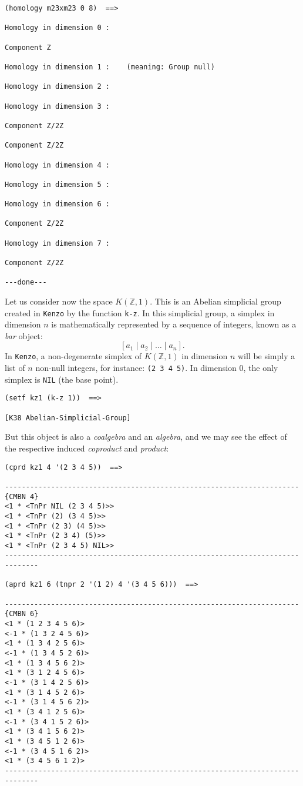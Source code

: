 {\footnotesize\begin{verbatim}
(homology m23xm23 0 8)  ==>

Homology in dimension 0 :

Component Z

Homology in dimension 1 :    (meaning: Group null)

Homology in dimension 2 :

Homology in dimension 3 :

Component Z/2Z

Component Z/2Z

Homology in dimension 4 :

Homology in dimension 5 :

Homology in dimension 6 :

Component Z/2Z

Homology in dimension 7 :

Component Z/2Z

---done---
\end{verbatim}}
\newpage
Let us consider now the space $K(\mathbb{Z}, 1)$. This is an Abelian simplicial group created  in {\tt Kenzo}
by the function {\tt k-z}.
In this simplicial group, a  simplex  in dimension $n$
is mathematically represented by a sequence of integers, known as a {\em bar} object:
$$ [a_1 \mid a_2 \mid \ldots \mid a_n]. $$
In {\tt Kenzo}, a non-degenerate simplex of $K(\mathbb{Z},1)$ in dimension $n$ will be simply
a list of $n$ non-null integers, for instance: {\tt (2 3 4 5)}. In dimension $0$, the only
simplex is {\tt NIL} (the base point).
{\footnotesize\begin{verbatim}
(setf kz1 (k-z 1))  ==>

[K38 Abelian-Simplicial-Group]
\end{verbatim}}
But this object is also a {\em coalgebra} and an {\em algebra}, and we may
see the effect of the respective induced {\em coproduct} and {\em product}:
{\footnotesize\begin{verbatim}
(cprd kz1 4 '(2 3 4 5))  ==>

----------------------------------------------------------------------{CMBN 4}
<1 * <TnPr NIL (2 3 4 5)>>
<1 * <TnPr (2) (3 4 5)>>
<1 * <TnPr (2 3) (4 5)>>
<1 * <TnPr (2 3 4) (5)>>
<1 * <TnPr (2 3 4 5) NIL>>
------------------------------------------------------------------------------

(aprd kz1 6 (tnpr 2 '(1 2) 4 '(3 4 5 6)))  ==>

----------------------------------------------------------------------{CMBN 6}
<1 * (1 2 3 4 5 6)>
<-1 * (1 3 2 4 5 6)>
<1 * (1 3 4 2 5 6)>
<-1 * (1 3 4 5 2 6)>
<1 * (1 3 4 5 6 2)>
<1 * (3 1 2 4 5 6)>
<-1 * (3 1 4 2 5 6)>
<1 * (3 1 4 5 2 6)>
<-1 * (3 1 4 5 6 2)>
<1 * (3 4 1 2 5 6)>
<-1 * (3 4 1 5 2 6)>
<1 * (3 4 1 5 6 2)>
<1 * (3 4 5 1 2 6)>
<-1 * (3 4 5 1 6 2)>
<1 * (3 4 5 6 1 2)>
------------------------------------------------------------------------------
\end{verbatim}}
